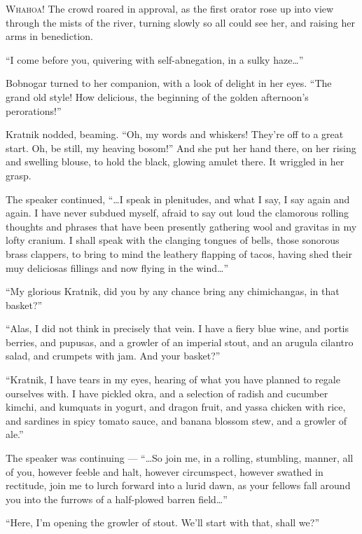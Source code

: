 
\lettrine{W}{hahoa!} The crowd roared in approval, as the first orator rose up into
view through the mists of the river, turning slowly so all could see
her, and raising her arms in benediction.

``I come before you, quivering with self-abnegation, in a sulky
haze\ldots{}''

Bobnogar turned to her companion, with a look of delight in her eyes.
``The grand old style! How delicious, the beginning of the golden
afternoon's perorations!''

Kratnik nodded, beaming. ``Oh, my words and whiskers! They're off to a
great start. Oh, be still, my heaving bosom!'' And she put her hand
there, on her rising and swelling blouse, to hold the black, glowing
amulet there. It wriggled in her grasp.

The speaker continued, ``\ldots{}I speak in plenitudes, and what I say, I
say again and again. I have never subdued myself, afraid to say out loud
the clamorous rolling thoughts and phrases that have been presently
gathering wool and gravitas in my lofty cranium. I shall speak with the
clanging tongues of bells, those sonorous brass clappers, to bring to
mind the leathery flapping of tacos, having shed their muy deliciosas
fillings and now flying in the wind\ldots{}''

``My glorious Kratnik, did you by any chance bring any chimichangas, in
that basket?''

``Alas, I did not think in precisely that vein. I have a fiery blue
wine, and portis berries, and pupusas, and a growler of an imperial
stout, and an arugula cilantro salad, and crumpets with jam. And your
basket?''

``Kratnik, I have tears in my eyes, hearing of what you have planned to
regale ourselves with. I have pickled okra, and a selection of radish
and cucumber kimchi, and kumquats in yogurt, and dragon fruit, and yassa
chicken with rice, and sardines in spicy tomato sauce, and banana
blossom stew, and a growler of ale.''

The speaker was continuing --- ``\ldots{}So join me, in a rolling, stumbling,
manner, all of you, however feeble and halt, however circumspect,
however swathed in rectitude, join me to lurch forward into a lurid
dawn, as your fellows fall around you into the furrows of a half-plowed
barren field\ldots{}''

``Here, I'm opening the growler of stout. We'll start with that, shall
we?''

